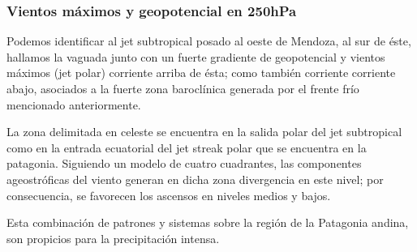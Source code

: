 \documentclass{article}
\begin{document}
\subsubsection{Vientos máximos y geopotencial en 250hPa}
Podemos identificar al jet subtropical posado al oeste de Mendoza, al sur de éste, hallamos la vaguada junto con un fuerte 
gradiente de geopotencial y vientos máximos (jet polar) corriente arriba de ésta; como también corriente corriente abajo, asociados
a la fuerte zona baroclínica generada por el frente frío mencionado anteriormente.
\par La zona delimitada en celeste se encuentra en la salida polar del jet subtropical como en la entrada ecuatorial del jet streak
polar que se encuentra en la patagonia. Siguiendo un modelo de cuatro cuadrantes, las componentes ageostróficas del viento generan 
en dicha zona divergencia en este nivel; por consecuencia, se favorecen los ascensos en niveles medios y bajos.
\par Esta combinación de patrones y sistemas sobre la región de la Patagonia andina, son propicios para la precipitación intensa.
\end{document}

